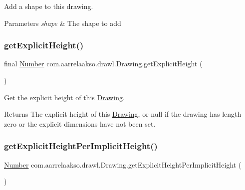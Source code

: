 Add a shape to this drawing. 


\begin{DoxyParams}{Parameters}
{\em shape} & The shape to add \\
\hline
\end{DoxyParams}
\mbox{\label{classcom_1_1aarrelaakso_1_1drawl_1_1_drawing_ade424cd3d355473603555ad6ce746e23}} 
\subsubsection{\texorpdfstring{get\+Explicit\+Height()}{getExplicitHeight()}}
{\footnotesize\ttfamily final \hyperlink{interfacecom_1_1aarrelaakso_1_1drawl_1_1_number}{Number} com.\+aarrelaakso.\+drawl.\+Drawing.\+get\+Explicit\+Height (\begin{DoxyParamCaption}{ }\end{DoxyParamCaption})}



Get the explicit height of this \hyperlink{classcom_1_1aarrelaakso_1_1drawl_1_1_drawing}{Drawing}. 

\begin{DoxyReturn}{Returns}
The explicit height of this \hyperlink{classcom_1_1aarrelaakso_1_1drawl_1_1_drawing}{Drawing}, or null if the drawing has length zero or the explicit dimensions have not been set. 
\end{DoxyReturn}
\mbox{\label{classcom_1_1aarrelaakso_1_1drawl_1_1_drawing_a7e165d3b122c0fd44404c20c1211c21f}} 
\subsubsection{\texorpdfstring{get\+Explicit\+Height\+Per\+Implicit\+Height()}{getExplicitHeightPerImplicitHeight()}}
{\footnotesize\ttfamily \hyperlink{interfacecom_1_1aarrelaakso_1_1drawl_1_1_number}{Number} com.\+aarrelaakso.\+drawl.\+Drawing.\+get\+Explicit\+Height\+Per\+Implicit\+Height (\begin{DoxyParamCaption}{ }\end{DoxyParamCaption})\hspace{0.3cm}{\ttfamily [private]}}



